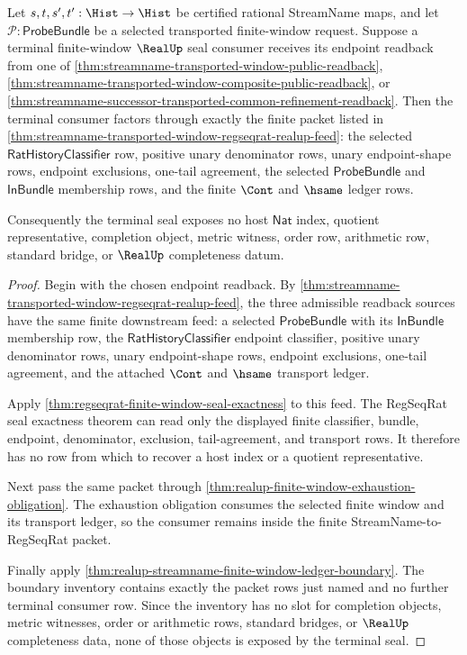 \begin{theorem}
\label{thm:streamname-realup-terminal-seal-boundary}
Let $s,t,s',t':\Hist\to\Hist$ be certified rational StreamName maps, and let
$\mathcal P:\mathsf{ProbeBundle}$ be a selected transported finite-window
request. Suppose a terminal finite-window $\RealUp$ seal consumer receives its
endpoint readback from one of
\autoref{thm:streamname-transported-window-public-readback},
\autoref{thm:streamname-transported-window-composite-public-readback}, or
\autoref{thm:streamname-successor-transported-common-refinement-readback}.
Then the terminal consumer factors through exactly the finite packet listed in
\autoref{thm:streamname-transported-window-regseqrat-realup-feed}: the selected
$\mathsf{RatHistoryClassifier}$ row, positive unary denominator rows, unary
endpoint-shape rows, endpoint exclusions, one-tail agreement, the selected
$\mathsf{ProbeBundle}$ and $\mathsf{InBundle}$ membership rows, and the finite
$\Cont$ and $\hsame$ ledger rows.

Consequently the terminal seal exposes no host $\mathsf{Nat}$ index, quotient
representative, completion object, metric witness, order row, arithmetic row,
standard bridge, or $\RealUp$ completeness datum.
\end{theorem}
\begin{proof}
Begin with the chosen endpoint readback. By
\autoref{thm:streamname-transported-window-regseqrat-realup-feed}, the three
admissible readback sources have the same finite downstream feed: a selected
$\mathsf{ProbeBundle}$ with its $\mathsf{InBundle}$ membership row, the
$\mathsf{RatHistoryClassifier}$ endpoint classifier, positive unary
denominator rows, unary endpoint-shape rows, endpoint exclusions, one-tail
agreement, and the attached $\Cont$ and $\hsame$ transport ledger.

Apply \autoref{thm:regseqrat-finite-window-seal-exactness} to this feed. The
RegSeqRat seal exactness theorem can read only the displayed finite classifier,
bundle, endpoint, denominator, exclusion, tail-agreement, and transport rows.
It therefore has no row from which to recover a host index or a quotient
representative.

Next pass the same packet through
\autoref{thm:realup-finite-window-exhaustion-obligation}. The exhaustion
obligation consumes the selected finite window and its transport ledger, so the
consumer remains inside the finite StreamName-to-RegSeqRat packet.

Finally apply
\autoref{thm:realup-streamname-finite-window-ledger-boundary}. The boundary
inventory contains exactly the packet rows just named and no further terminal
consumer row. Since the inventory has no slot for completion objects, metric
witnesses, order or arithmetic rows, standard bridges, or $\RealUp$
completeness data, none of those objects is exposed by the terminal seal.
\end{proof}

